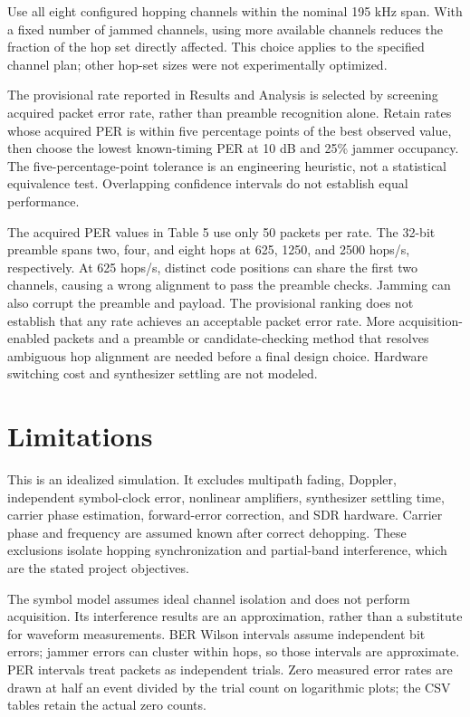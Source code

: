 \documentclass[
]{article}
\begin{document}
Use all eight configured hopping channels within the nominal 195 kHz
span. With a fixed number of jammed channels, using more available
channels reduces the fraction of the hop set directly affected. This
choice applies to the specified channel plan; other hop-set sizes were
not experimentally optimized.

The provisional rate reported in Results and Analysis is selected by
screening acquired packet error rate, rather than preamble recognition
alone. Retain rates whose acquired PER is within five percentage points
of the best observed value, then choose the lowest known-timing PER at
10 dB and 25\% jammer occupancy. The five-percentage-point tolerance is
an engineering heuristic, not a statistical equivalence test.
Overlapping confidence intervals do not establish equal performance.

The acquired PER values in Table 5 use only 50 packets per rate. The
32-bit preamble spans two, four, and eight hops at 625, 1250, and 2500
hops/s, respectively. At 625 hops/s, distinct code positions can share
the first two channels, causing a wrong alignment to pass the preamble
checks. Jamming can also corrupt the preamble and payload. The
provisional ranking does not establish that any rate achieves an
acceptable packet error rate. More acquisition-enabled packets and a
preamble or candidate-checking method that resolves ambiguous hop
alignment are needed before a final design choice. Hardware switching
cost and synthesizer settling are not modeled.

\section{Limitations}\label{limitations}

This is an idealized simulation. It excludes multipath fading, Doppler,
independent symbol-clock error, nonlinear amplifiers, synthesizer
settling time, carrier phase estimation, forward-error correction, and
SDR hardware. Carrier phase and frequency are assumed known after
correct dehopping. These exclusions isolate hopping synchronization and
partial-band interference, which are the stated project objectives.

The symbol model assumes ideal channel isolation and does not perform
acquisition. Its interference results are an approximation, rather than
a substitute for waveform measurements. BER Wilson intervals assume
independent bit errors; jammer errors can cluster within hops, so those
intervals are approximate. PER intervals treat packets as independent
trials. Zero measured error rates are drawn at half an event divided by
the trial count on logarithmic plots; the CSV tables retain the actual
zero counts.
\end{document}
